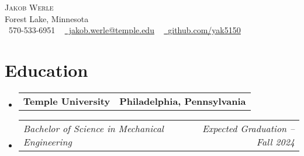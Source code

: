 \documentclass[letterpaper,11pt]{article}
\makeatletter
\newcommand{\company}[2]{
  \vspace{-2pt}\item
    \begin{tabular*}{1.0\textwidth}[t]{l@{\extracolsep{\fill}}r}
      \textbf{#1} & \textbf{\small #2} \\
    \end{tabular*}\vspace{-18pt}
}
\newcommand{\role}[2]{
  \vspace{-5pt}\item
    \begin{tabular*}{1.0\textwidth}[t]{l@{\extracolsep{\fill}}r}
      \textit{\small#1} & \textit{\small #2} \\
    \end{tabular*}\vspace{-7pt}
}
\newcommand{\companyListStart}{\begin{itemize}[leftmargin=0.0in, label={}]}
\newcommand{\companyListEnd}{\end{itemize}}
\makeatother
\begin{document}

\begin{center}
    {\Huge \scshape Jakob Werle} \\ \vspace{1pt}
    Forest Lake, Minnesota \\ \vspace{1pt}
    \small \raisebox{-0.1\height}\faPhone\ 570-533-6951 ~ \href{mailto:jakob.werle@temple.edu}{\raisebox{-0.2\height}\faEnvelope\ jakob.werle@temple.edu} ~ 
    \href{https://github.com/yak5150}{\raisebox{-0.2\height}\faGithub\ \underline{github.com/yak5150}}
    \vspace{-8pt}
\end{center}

\section{Education}
  \companyListStart
    \company{Temple University}{Philadelphia, Pennsylvania}
      \role{Bachelor of Science in Mechanical Engineering}{Expected Graduation -- Fall 2024}
  \companyListEnd

\end{document}
